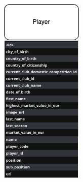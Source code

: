 \documentclass{Configuration_Files/PoliMi3i_thesis}
\begin{document}
\begin{figure}[htbp]
\begin{subfigure}[b]{0.23\linewidth}
  \end{subfigure}
  \hfill
  \begin{subfigure}[b]{0.25\linewidth}
    \includegraphics[width=\linewidth]{Project Template/Images/entities/player.drawio.png}
  \end{subfigure}
  

\end{figure}
\end{document}
